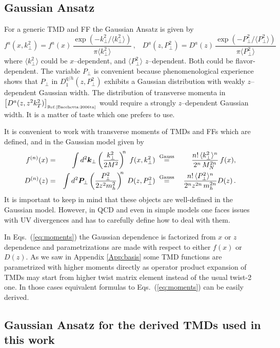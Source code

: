 \documentclass[a4paper,11pt]{article}
\newcommand{\be}{\begin{equation}}
\newcommand{\ee}{\end{equation}}
\newcommand{\la}{\langle}
\newcommand{\ra}{\rangle}
\newcommand{\mh}{ m_h }
\def\bfkperp{{\bm k}_\perp}
\def\bfpperp{{\bm P}_\perp}
\def\kperp{k_\perp}
\def\pperp{P_\perp}
\begin{document}
\subsection{Gaussian Ansatz}

For a generic TMD and FF the Gaussian Ansatz is given by
\be
    f^a(x,\kperp^2)=
    f^a(x)\,\frac{\exp(-\kperp^2/\la\kperp^2\ra)}{\pi\la\kperp^2\ra}\,,\;\;\;
    D^a(z,\pperp^2)=
    D^a(z)\,\frac{\exp(-\pperp^2/\la\pperp^2\ra)}{\pi\la\pperp^2\ra}
\ee
where
$\la\kperp^2\ra$ could be $x$--dependent,
and $\la\pperp^2\ra$ $z$--dependent.
Both could be flavor-dependent.
The variable $\pperp$ is convenient because phenomenological experience
shows that $\pperp$ in $D_1^{q/h}(z,\pperp^2)$ exhibits a Gaussian distribution
with weakly $z$--dependent Gaussian width. The distribution of transverse
momenta in $\left[D^a(z,z^2 k_T^2)\right]_{\mbox{\tiny Ref.\cite{Bacchetta:2006tn}}}$
would require a strongly $z$--dependent Gaussian width. It is a matter of
taste which one prefers to use.

It is convenient to work with transverse moments of TMDs and FFs
which are defined, and in the Gaussian model given by
\begin{alignat}{6}
	f^{(n)}(x) &=& \int d^2\bfkperp
	\left(\frac{\kperp^2}{2M^2}\right)^{\!\!n}\; f(x, \kperp^2)
	\;&\stackrel{\rm Gauss}{=}&\;
	\frac{n!\,\la \kperp^2\ra^n}{ 2^n\,M_N^{2n}}\, f(x),\;\;\;\nonumber\\
	D^{(n)}(z) &=& \int d^2\bfpperp
	\left(\frac{\pperp^2}{2 z^2 \mh^2}\right)^{\!\!n}\; D(z, \pperp^2)
	\;&\stackrel{\rm Gauss}{=}&\;
	\frac{n!\,\la \pperp^2\ra^n}{ 2^n_{ }z^{2n}_{ }\,m_{h}^{2n}} D(z)\,. \;\;\;
	\label{eq:moments}
\end{alignat}
It is important to keep in mind that these objects are well-defined
in the Gaussian model. However, in QCD and even in simple models
\cite{Avakian:2010br,Schweitzer:2012hh} one faces issues with UV
divergences and has to carefully define how to deal with them.

In Eqs.~(\ref{eq:moments}) the Gaussian dependence is factorized
from $x$ or $z$ dependence and parametrizations are made with
respect to either $f(x)$ or $D(z)$. As we saw in Appendix
\ref{App:basis} some TMD functions are parametrized with higher
moments directly as operator product expansion of TMDs may start
from higher twist matrix element instead of the usual twist-2 one.
In those cases equivalent formulas to Eqs.~(\ref{eq:moments}) can
be easily derived.

\subsection{Gaussian Ansatz for the derived TMDs used in this work}
\label{App-B:Gauss-Ansatz-non-basis-TMDs}
\end{document}
